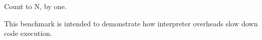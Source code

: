 Count to N, by one.

This benchmark is intended to demonstrate how
interpreter overheads slow down code execution.

